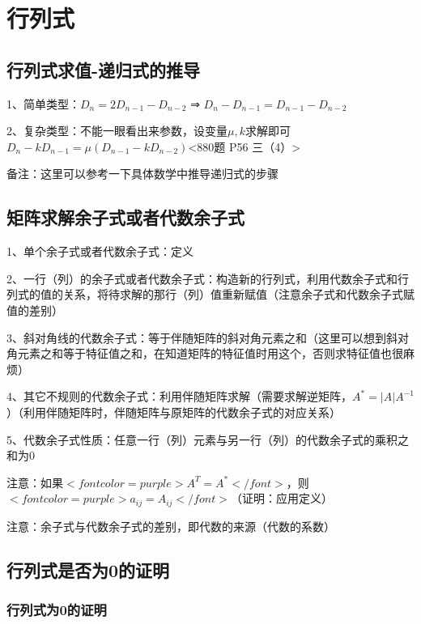 \chapter{行列式}

\section{行列式求值-递归式的推导}

1、简单类型：$ D_{n}=2D_{n-1}-D_{n-2} $ ⇒ $ D_{n}-D_{n-1} = D_{n-1}-D_{n-2} $

2、复杂类型：不能一眼看出来参数，设变量$ \mu ,k $求解即可$ D_{n}-kD_{n-1} = \mu (D_{n-1}-kD_{n-2}) $<880题 P56 三（4）>

备注：这里可以参考一下具体数学中推导递归式的步骤

\section{矩阵求解余子式或者代数余子式}

1、单个余子式或者代数余子式：定义

2、一行（列）的余子式或者代数余子式：构造新的行列式，利用代数余子式和行列式的值的关系，将待求解的那行（列）值重新赋值（注意余子式和代数余子式赋值的差别）

3、斜对角线的代数余子式：等于伴随矩阵的斜对角元素之和（这里可以想到斜对角元素之和等于特征值之和，在知道矩阵的特征值时用这个，否则求特征值也很麻烦）

4、其它不规则的代数余子式：利用伴随矩阵求解（需要求解逆矩阵，$ A^*=|A|A^{-1} $）（利用伴随矩阵时，伴随矩阵与原矩阵的代数余子式的对应关系）

5、代数余子式性质：任意一行（列）元素与另一行（列）的代数余子式的乘积之和为0

注意：如果$ <font color=purple>A^T=A^*</font> $，则$ <font color=purple>a_{ij}=A_{ij}</font> $（证明：应用定义）

注意：余子式与代数余子式的差别，即代数的来源（代数的系数）

\section{行列式是否为0的证明}



\subsection{行列式为0的证明}

